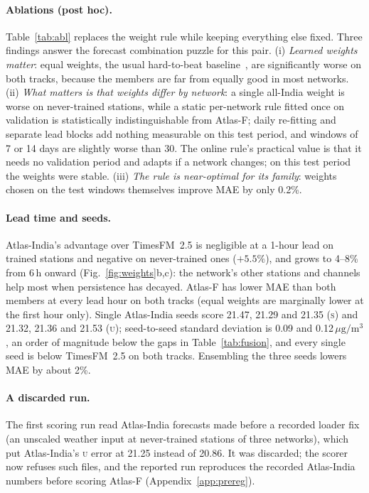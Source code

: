 \documentclass{article}
\newcommand{\pmu}{\ensuremath{\mu\mathrm{g/m^3}}}
\newcommand{\trk}[1]{\textsc{#1}}
\begin{document}
\paragraph{Ablations (post hoc).} Table~\ref{tab:abl} replaces the weight rule while keeping everything else fixed.
Three findings answer the forecast combination puzzle for this
pair. (i) \emph{Learned weights matter}: equal weights, the usual hard-to-beat baseline~\citep{smith2009puzzle}, are
significantly worse on both tracks, because the members are far from equally good in most networks. (ii) \emph{What
matters is that weights differ by network}: a single all-India weight is worse on never-trained stations, while a
static per-network rule fitted once on validation is statistically indistinguishable from Atlas-F; daily re-fitting
and separate lead blocks add nothing measurable on this test period, and windows of 7 or 14 days are slightly worse
than 30. The online rule's practical value is that it needs no validation period and adapts if a network changes;
on this test period the weights were stable. (iii) \emph{The rule is near-optimal for its family}: weights chosen on the
test windows themselves improve MAE by only 0.2\%.

\paragraph{Lead time and seeds.} Atlas-India's advantage over TimesFM~2.5 is negligible at a 1-hour lead on trained
stations and negative on never-trained ones ($+5.5\%$), and grows to 4--8\% from 6\,h onward (Fig.~\ref{fig:weights}b,c):
the network's other stations and channels help most when persistence has decayed. Atlas-F has lower MAE than both members at every lead
hour on both tracks (equal weights are marginally lower at the first hour only). Single Atlas-India seeds score 21.47, 21.29 and 21.35 (\trk{s}) and 21.32, 21.36 and 21.53
(\trk{u}); seed-to-seed standard deviation is 0.09 and 0.12\,\pmu, an order of magnitude below the gaps in
Table~\ref{tab:fusion}, and every single seed is below TimesFM~2.5 on both tracks. Ensembling the three seeds lowers MAE
by about 2\%.

\paragraph{A discarded run.} The first scoring run read Atlas-India forecasts made before a recorded loader fix
(an unscaled weather input at never-trained stations of three networks), which put Atlas-India's \trk{u} error at 21.25
instead of 20.86. It was discarded; the scorer now refuses such files, and the reported run reproduces the recorded
Atlas-India numbers before scoring Atlas-F (Appendix~\ref{app:prereg}).
\end{document}
